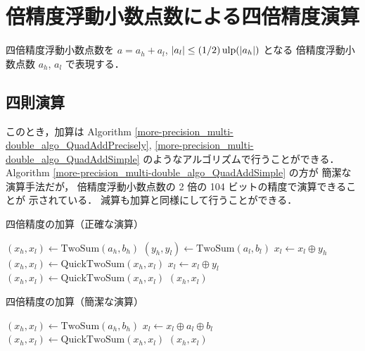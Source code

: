 \clearpage

\section{倍精度浮動小数点数による四倍精度演算}

四倍精度浮動小数点数を $a = a_h + a_l$, $|a_l| \le (1/2) \operatorname{ulp}(|a_h|)$ となる
倍精度浮動小数点数 $a_h$, $a_l$ で表現する．

\subsection{四則演算}

このとき，加算は
Algorithm \ref{more-precision_multi-double_algo_QuadAddPrecisely},
\ref{more-precision_multi-double_algo_QuadAddSimple}
のようなアルゴリズムで行うことができる．
Algorithm \ref{more-precision_multi-double_algo_QuadAddSimple} の方が
簡潔な演算手法だが，
倍精度浮動小数点数の 2 倍の 104 ビットの精度で演算できることが
示されている\cite{Naoya2012}．
減算も加算と同様にして行うことができる．

\begin{algorithm}[tp]
    \caption{四倍精度の加算（正確な演算）\cite{Hisashi2006}}
    \label{more-precision_multi-double_algo_QuadAddPrecisely}
    \begin{algorithmic}
        \State $(x_h, x_l) \gets \text{TwoSum}(a_h, b_h)$
        \State $(y_h, y_l) \gets \text{TwoSum}(a_l, b_l)$
        \State $x_l \gets x_l \oplus y_h$
        \State $(x_h, x_l) \gets \text{QuickTwoSum}(x_h, x_l)$
        \State $x_l \gets x_l \oplus y_l$
        \State $(x_h, x_l) \gets \text{QuickTwoSum}(x_h, x_l)$
        \State \Return $(x_h, x_l)$
        \EndProcedure
    \end{algorithmic}
\end{algorithm}

\begin{algorithm}[tp]
    \caption{四倍精度の加算（簡潔な演算）\cite{Naoya2012,Hirayama2014}}
    \label{more-precision_multi-double_algo_QuadAddSimple}
    \begin{algorithmic}
        \State $(x_h, x_l) \gets \text{TwoSum}(a_h, b_h)$
        \State $x_l \gets x_l \oplus a_l \oplus b_l$
        \State $(x_h, x_l) \gets \text{QuickTwoSum}(x_h, x_l)$
        \State \Return $(x_h, x_l)$
        \EndProcedure
    \end{algorithmic}
\end{algorithm}

